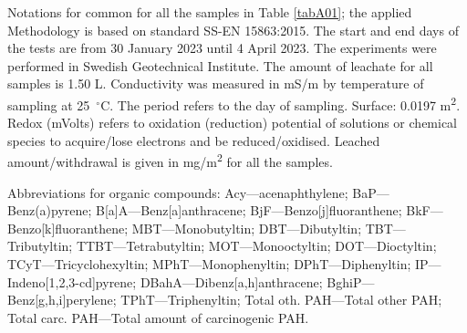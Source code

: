 \documentclass[algorithms,article,accept,pdftex,moreauthors]{Definitions/mdpi}
\begin{document}
Notations for common for all the samples in Table \ref{tabA01}; the applied Methodology is based on standard SS-EN 15863:2015. The start and end days of the tests are from 30 January 2023 until 4 April 2023. The experiments were performed in Swedish Geotechnical Institute. The amount of leachate for all samples is 1.50 L. Conductivity was measured in mS/m by temperature of sampling at 25~$^\circ$C. The period refers to the day of sampling. Surface: 0.0197 m\textsuperscript{2}. Redox (mVolts) refers to oxidation (reduction) potential of solutions or chemical species to acquire/lose electrons and be reduced/oxidised. Leached amount/withdrawal is given in mg/m\textsuperscript{2} for all the samples. 

Abbreviations for organic compounds: Acy---acenaphthylene; BaP---Benz(a)pyrene; B[a]A---Benz[a]anthracene; %
 BjF---Benzo[j]fluoranthene; BkF---Benzo[k]fluoranthene; MBT---Monobutyltin; DBT---Dibutyltin; TBT---Tributyltin; TTBT---Tetrabutyltin; \linebreak MOT---Monooctyltin; DOT---Dioctyltin; TCyT---Tricyclohexyltin; MPhT---Monophenyltin; DPhT---Diphenyltin; IP---Indeno[1,2,3-cd]pyrene; DBahA---Dibenz[a,h]anthracene; BghiP---Benz[g,h,i]perylene; TPhT---Triphenyltin; Total oth. PAH---Total other PAH; Total carc. PAH---Total amount of carcinogenic PAH. 
\end{document}
